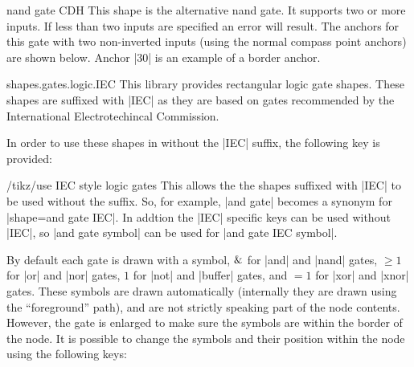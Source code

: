 \begin{shape}{nand gate CDH}
  This shape is the alternative nand gate. It supports two or more inputs.
  If less than two inputs are specified an error will result. 
	The anchors for this gate with two
  non-inverted inputs (using the normal compass point anchors) are
  shown below. Anchor |30| is an example of a border anchor.
  
\begin{codeexample}[]
\Huge
{}
\end{codeexample}

\end{shape}



\begin{pgflibrary}{shapes.gates.logic.IEC}
  This library provides rectangular logic gate shapes. These shapes
  are suffixed with |IEC| as they are based on gates recommended by
  the International Electrotechincal Commission.
\end{pgflibrary}

  In order to use these shapes in \tikzname{} without the |IEC|
  suffix, the following key is provided:
  
\begin{key}{/tikz/use IEC style logic gates}
	This allows the the shapes suffixed with |IEC| to be used without
	the suffix. So, for example, |and gate| becomes a synonym for
	|shape=and gate IEC|. In addtion the |IEC| specific keys can be
	used without |IEC|, so |and gate symbol| can be
	used for |and gate IEC symbol|.
\end{key}

  By default each gate is drawn with a symbol, $\char`\&$ for |and| and 
  |nand| gates, $\geq1$ for |or| and |nor| gates, $1$ for |not| and 
  |buffer| gates, and $=1$ for |xor| and |xnor| gates. These symbols 
  are drawn automatically (internally they are drawn using the 
  ``foreground'' path), and are not strictly speaking part of the node
  contents. However, the gate is enlarged to make sure the symbols are 
  within the border of the node.
  It is possible to change
  the symbols and their position within the node using the following
  keys:
  
